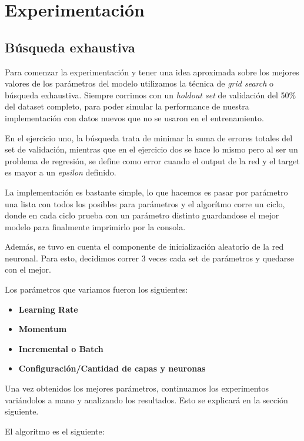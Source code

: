 \section{Experimentación}
\subsection{Búsqueda exhaustiva}
Para comenzar la experimentación y tener una idea aproximada sobre los mejores valores de los parámetros del modelo utilizamos la técnica de \textit{grid search} o búsqueda exhaustiva. Siempre corrimos con un \textit{holdout set} de validación del 50\% del dataset completo, para poder simular la performance de nuestra implementación con datos nuevos que no se usaron en el entrenamiento. 

En el ejercicio uno, la búsqueda trata de minimar la suma de errores totales del set de validación, mientras que en el ejercicio dos se hace lo mismo pero al ser un problema de regresión, se define como error cuando el output de la red y el target es mayor a un \textit{epsilon} definido. 

La implementación es bastante simple, lo que hacemos es pasar por parámetro una lista con todos los posibles para parámetros y el algorítmo corre un ciclo, donde en cada ciclo prueba con un parámetro distinto guardandose el mejor modelo para finalmente imprimirlo por la consola. 

Además, se tuvo en cuenta el componente de inicialización aleatorio de la red neuronal. Para esto, decidimos correr 3 veces cada set de parámetros y quedarse con el mejor. 

Los parámetros que variamos fueron los siguientes:
\begin{itemize}
\item \textbf{Learning Rate}
\item \textbf{Momentum}
\item \textbf{Incremental o Batch}
\item \textbf{Configuración/Cantidad de capas y neuronas}
\end{itemize}

Una vez obtenidos los mejores parámetros, continuamos los experimentos variándolos a mano y analizando los resultados. Esto se explicará en la sección siguiente.

El algoritmo es el siguiente:

